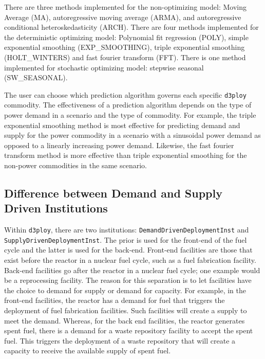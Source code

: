 \documentclass[11pt,letterpaper]{article}
\newcommand{\deploy}{\texttt{d3ploy}\xspace}%
\begin{document}
There are three methods implemented for the non-optimizing model: 
Moving Average (MA), autoregressive moving average (ARMA), and autoregressive 
conditional heteroskedasticity (ARCH).
There are four methods implemented for the deterministic optimizing model: 
Polynomial fit regression (POLY), simple exponential smoothing (EXP\_SMOOTHING),  
triple exponential smoothing (HOLT\_WINTERS) and fast fourier 
transform (FFT). 
There is one method implemented for stochastic optimizing model: 
stepwise seasonal (SW\_SEASONAL).  

The user can choose which prediction algorithm governs each specific 
\deploy commodity. 
The effectiveness of a prediction algorithm depends on the type 
of power demand in a scenario and the type of commodity. 
For example, the triple exponential smoothing method is most effective
for predicting demand and supply for the power commodity in a scenario  
with a sinusoidal power demand as opposed to a linearly increasing power 
demand.
Likewise, the fast fourier transform method is more effective than triple 
exponential smoothing for the non-power commodities in the same 
scenario.  

\subsection{\textbf{Difference between Demand and Supply Driven Institutions}}
Within \deploy, there are two institutions: \texttt{DemandDrivenDeploymentInst} and \texttt{SupplyDrivenDeploymentInst}. 
The prior is used for the front-end of the fuel cycle and the latter is used 
for the back-end. 
Front-end facilities are those that exist before the reactor 
in a nuclear fuel cycle, such as a fuel fabrication facility. 
Back-end facilities go after the reactor in a nuclear 
fuel cycle; one example would be a reprocessing facility. 
The reason for this separation is to let facilities have the choice 
to demand for supply or demand for capacity. 
For example, in the front-end facilities, the reactor has a demand for 
fuel that triggers the deployment of fuel fabrication facilities. Such facilities
will create a supply to meet the demand.
Whereas, for the back end facilities, the reactor generates spent fuel, 
there is a demand for a waste repository facility to accept the 
spent fuel. This triggers the deployment of a waste repository that
will create a capacity to receive the available supply of spent fuel.
\end{document}
